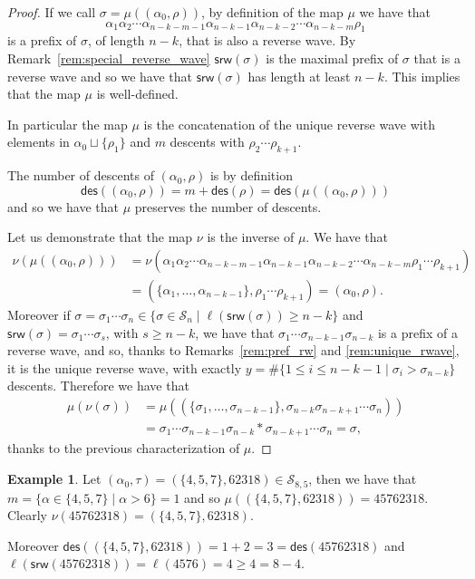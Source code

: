 \documentclass[a4paper]{amsart}
\newcommand{\des}{\mathsf{des}}
\newcommand{\srw}{\mathsf{srw}}
\theoremstyle{definition}
\newtheorem{example}[theorem]{Example}
\theoremstyle{remark}
\numberwithin{equation}{section}
\begin{document}
\begin{proof}
If we call $\sigma=\mu((\alpha_0,\rho))$, by definition of the map $\mu$ we have that $$\alpha_1\alpha_2\cdots\alpha_{n-k-m-1}\alpha_{n-k-1}\alpha_{n-k-2}\cdots\alpha_{n-k-m}\rho_1$$ is a prefix of $\sigma$, of length $n-k$, that is also a reverse wave. By Remark~\ref{rem:special_reverse_wave} $\srw(\sigma)$ is the maximal prefix of $\sigma$ that is a reverse wave and so we have that $\srw(\sigma)$ has length at least $n-k$. This implies that the map $\mu$ is well-defined.

In particular the map $\mu$ is the concatenation of the unique reverse wave with elements in $\alpha_0\sqcup\{\rho_1\}$ and $m$ descents with $\rho_2\cdots\rho_{k+1}$.

The number of descents of $(\alpha_0,\rho)$ is by definition
\begin{equation*}
   \des((\alpha_0,\rho))=m+\des(\rho)= \des(\mu((\alpha_0,\rho)))
\end{equation*}
and so we have that $\mu$ preserves the number of descents.

Let us demonstrate that the map $\nu$ is the inverse of $\mu$. We have that
\begin{align*}
    \nu(\mu((\alpha_0,\rho)))&=\nu(\alpha_1\alpha_2\cdots\alpha_{n-k-m-1}\alpha_{n-k-1}\alpha_{n-k-2}\cdots\alpha_{n-k-m}\rho_1\cdots\rho_{k+1})\\
    &=(\{\alpha_1,\dots,\alpha_{n-k-1}\},\rho_1\cdots\rho_{k+1})=(\alpha_0,\rho).
\end{align*}
Moreover if $\sigma=\sigma_1\cdots\sigma_n\in\{\sigma\in\mathcal{S}_n\mid \ell(\srw(\sigma))\geq n-k\}$ and $\srw(\sigma)=\sigma_1\cdots\sigma_s$, with $s\geq n-k$, we have that $\sigma_1\cdots\sigma_{n-k-1}\sigma_{n-k}$ is a prefix of a reverse wave, and so, thanks to Remarks~\ref{rem:pref_rw} and \ref{rem:unique_rwave}, it is the unique reverse wave, with exactly $y=\#\{1\leq i\leq n-k-1\mid\sigma_i>\sigma_{n-k}\}$ descents. Therefore we have that 
\begin{align*}
    \mu(\nu(\sigma))&=\mu((\{\sigma_1,\dots,\sigma_{n-k-1}\},\sigma_{n-k}\sigma_{n-k+1}\cdots\sigma_n)) \\
&=\sigma_1\cdots\sigma_{n-k-1}\sigma_{n-k}*\sigma_{n-k+1}\cdots\sigma_n=\sigma,
\end{align*}
thanks to the previous characterization of $\mu$. 
\end{proof}

\begin{example}
Let $(\alpha_0,\tau)=(\{4,5,7\},62318)\in \mathcal{S}_{8,5}$, then we have that ${m=\{\alpha\in\{4,5,7\}\mid\alpha>6\}=1}$ and so $\mu((\{4,5,7\},62318))=45762318$. Clearly $\nu(45762318)=(\{4,5,7\},62318)$. 

Moreover ${\des((\{4,5,7\},62318))=1+2=3=\des(45762318)}$ and $\ell(\srw(45762318))=\ell(4576)=4\geq4=8-4$.
\end{example}
\end{document}

